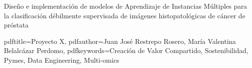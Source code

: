 

\titulo
{Diseño e implementación de modelos de Aprendizaje de Instancias Múltiples para la clasificación débilmente supervisada de imágenes histopatológicas de cáncer de próstata}



\fecha{\today}

\hypersetup
{
  pdftitle={Proyecto X},
  pdfauthor={Juan José Restrepo Rosero, María Valentina Belalcázar Perdomo},
  pdfkeywords={Creación de Valor Compartido, Sostenibilidad, Pymes, Data Engineering, Multi-omics}
}




